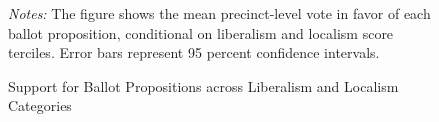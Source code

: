 \documentclass[article,12pt]{memoir}
\begin{document}
\begin{figure}[p]\centering
  \caption{Support for Ballot Propositions across Liberalism and Localism Categories}
  \label{fig:hg_g_pc}
  \begin{measuredfigure}
  \end{measuredfigure}
  \begin{tablenotes}[flushleft]
    \item \hspace{-.2em}\emph{Notes:} The figure shows the mean precinct-level vote in favor of each ballot proposition, conditional on liberalism and localism score terciles. Error bars represent 95 percent confidence intervals.
  \end{tablenotes}
\end{figure}
\end{document}
